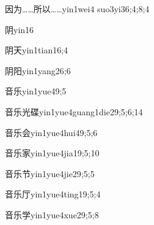\begin{verbete}{因为……所以……}{yin1wei4 suo3yi3}{6;4;8;4}
\end{verbete}

\begin{verbete}{阴}{yin1}{6}
\end{verbete}

\begin{verbete}{阴天}{yin1tian1}{6;4}
\end{verbete}

\begin{verbete}{阴阳}{yin1yang2}{6;6}
\end{verbete}

\begin{verbete}{音乐}{yin1yue4}{9;5}
\end{verbete}

\begin{verbete}{音乐光碟}{yin1yue4guang1die2}{9;5;6;14}
\end{verbete}

\begin{verbete}{音乐会}{yin1yue4hui4}{9;5;6}
\end{verbete}

\begin{verbete}{音乐家}{yin1yue4jia1}{9;5;10}
\end{verbete}

\begin{verbete}{音乐节}{yin1yue4jie2}{9;5;5}
\end{verbete}

\begin{verbete}{音乐厅}{yin1yue4ting1}{9;5;4}
\end{verbete}

\begin{verbete}{音乐学}{yin1yue4xue2}{9;5;8}
\end{verbete}

